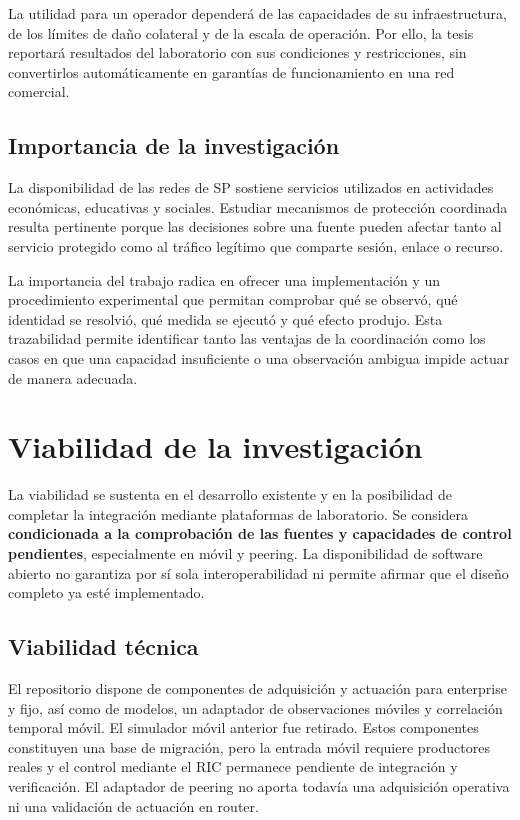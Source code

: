La utilidad para un operador dependerá de las capacidades de su infraestructura, de los límites de daño colateral y de la escala de operación. Por ello, la tesis reportará resultados del laboratorio con sus condiciones y restricciones, sin convertirlos automáticamente en garantías de funcionamiento en una red comercial.

\subsection{Importancia de la investigación}

La disponibilidad de las redes de SP sostiene servicios utilizados en actividades económicas, educativas y sociales. Estudiar mecanismos de protección coordinada resulta pertinente porque las decisiones sobre una fuente pueden afectar tanto al servicio protegido como al tráfico legítimo que comparte sesión, enlace o recurso.

La importancia del trabajo radica en ofrecer una implementación y un procedimiento experimental que permitan comprobar qué se observó, qué identidad se resolvió, qué medida se ejecutó y qué efecto produjo. Esta trazabilidad permite identificar tanto las ventajas de la coordinación como los casos en que una capacidad insuficiente o una observación ambigua impide actuar de manera adecuada.

\section{Viabilidad de la investigación}

La viabilidad se sustenta en el desarrollo existente y en la posibilidad de completar la integración mediante plataformas de laboratorio. Se considera \textbf{condicionada a la comprobación de las fuentes y capacidades de control pendientes}, especialmente en móvil y peering. La disponibilidad de software abierto no garantiza por sí sola interoperabilidad ni permite afirmar que el diseño completo ya esté implementado.

\subsection{Viabilidad técnica}

El repositorio dispone de componentes de adquisición y actuación para enterprise y fijo, así como de modelos, un adaptador de observaciones móviles y correlación temporal móvil. El simulador móvil anterior fue retirado. Estos componentes constituyen una base de migración, pero la entrada móvil requiere productores reales y el control mediante el RIC permanece pendiente de integración y verificación. El adaptador de peering no aporta todavía una adquisición operativa ni una validación de actuación en router.

